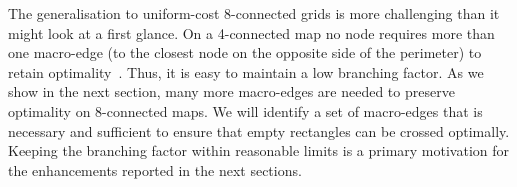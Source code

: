 The generalisation to uniform-cost 8-connected grids is more challenging than it might look
at a first glance.  On a 4-connected map no node requires more than one
macro-edge (to the closest node on the opposite side of the perimeter) to retain
optimality~\cite{harabor10}.  Thus, it is easy to maintain a low branching
factor.
As we show in the next section, many more macro-edges are
needed to preserve optimality on 8-connected maps. We will identify a set of
macro-edges that is necessary and sufficient to ensure that empty rectangles can
be crossed optimally.  Keeping the branching factor within reasonable limits is
a primary motivation for the enhancements reported in the next sections.

